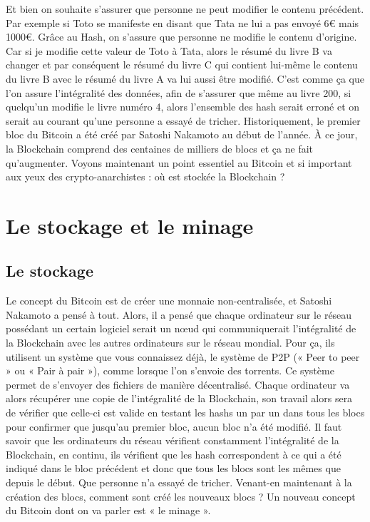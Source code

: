 \documentclass{bredele} %
\begin{document}
    Et bien on souhaite s’assurer que personne ne peut modifier le contenu précédent. Par exemple si Toto se manifeste en disant que Tata ne lui a pas envoyé 6€ mais 1000€. Grâce au Hash, on s’assure que personne ne modifie le contenu d’origine. Car si je modifie cette valeur de Toto à Tata, alors le résumé du livre B va changer et par conséquent le résumé du livre C qui contient lui-même le contenu du livre B avec le résumé du livre A va lui aussi être modifié.
    \newline
    C’est comme ça que l’on assure l’intégralité des données, afin de s’assurer que même au livre 200, si quelqu’un modifie le livre numéro 4, alors l’ensemble des hash serait erroné et on serait au courant qu’une personne a essayé de tricher.
    \newline
    Historiquement, le premier bloc du Bitcoin a été créé par Satoshi Nakamoto au début de l’année. À ce jour, la Blockchain comprend des centaines de milliers de blocs et ça ne fait qu’augmenter.
    \newline
    \newline
    Voyons maintenant un point essentiel au Bitcoin et si important aux yeux des crypto-anarchistes : où est stockée la Blockchain ?
    \chapter{Le stockage et le minage}
            \section*{Le stockage}
            Le concept du Bitcoin est de créer une monnaie non-centralisée, et Satoshi Nakamoto a pensé à tout. Alors, il a pensé que chaque ordinateur sur le réseau possédant un certain logiciel serait un nœud qui communiquerait l’intégralité de la Blockchain avec les autres ordinateurs sur le réseau mondial. Pour ça, ils utilisent un système que vous connaissez déjà, le système de P2P (« Peer to peer » ou « Pair à pair »), comme lorsque l’on s’envoie des torrents. Ce système permet de s’envoyer des fichiers de manière décentralisé.
    \newline
    Chaque ordinateur va alors récupérer une copie de l’intégralité de la Blockchain, son travail alors sera de vérifier que celle-ci est valide en testant les hashs un par un dans tous les blocs pour confirmer que jusqu’au premier bloc, aucun bloc n’a été modifié.
    \newline
    Il faut savoir que les ordinateurs du réseau vérifient constamment l’intégralité de la Blockchain, en continu, ils vérifient que les hash correspondent à ce qui a été indiqué dans le bloc précédent et donc que tous les blocs sont les mêmes que depuis le début. Que personne n’a essayé de tricher.
            \newline
            \newline
            Venant-en maintenant à la création des blocs, comment sont créé les nouveaux blocs ? Un nouveau concept du Bitcoin dont on va parler est « le minage ».
\end{document}
